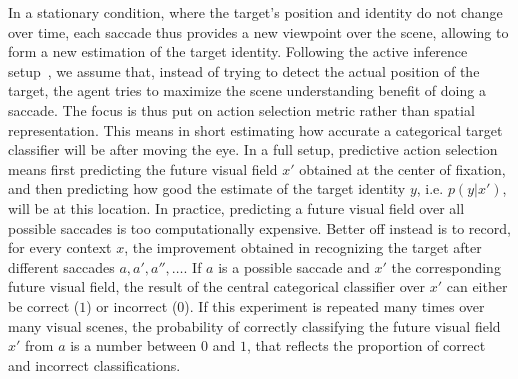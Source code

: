In a stationary condition, where the target's position and identity do not change over time, each saccade thus provides a new viewpoint over the scene, allowing to form a new estimation of the target identity.
Following the active inference setup~\cite{Najemnik05, Friston12}, we assume that, instead of trying to detect the actual position of the target, the agent tries to maximize the scene understanding benefit of doing a saccade. The focus is thus put on action selection metric rather than spatial representation.
This means in short estimating how accurate a categorical target classifier will be after moving the eye.
In a full setup, predictive action selection means first predicting the future visual field $x'$ obtained at the center of fixation, and then predicting how good the %
estimate of the target identity $y$, i.e. $p(y|x')$, will be at this location.
In practice, %
predicting a future visual field over all possible saccades is too computationally expensive. %
Better off instead is to record, for every context $x$, the improvement obtained in recognizing the target after different saccades $a, a', a'', \ldots$.
If $a$ is a possible saccade and $x'$ the corresponding future visual field, the result of the central categorical classifier over $x'$ can either be correct ($1$) or incorrect ($0$).
If this experiment is repeated many times over many visual scenes, the probability of correctly classifying the future visual field $x'$ from $a$ is a number between $0$ and $1$, that reflects the proportion of correct and incorrect classifications.
